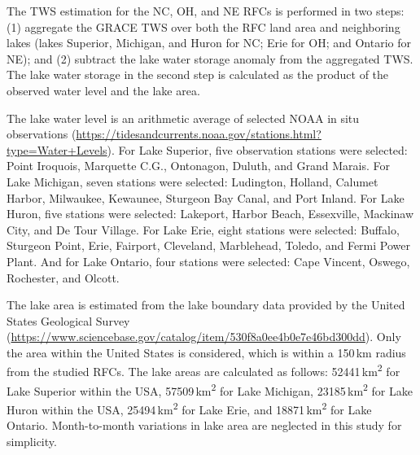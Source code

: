 \documentclass[essd, manuscript]{copernicus}
\begin{document}
The TWS estimation for the NC, OH, and NE RFCs is performed in two steps: (1) aggregate the GRACE TWS over both the RFC land area and neighboring lakes (lakes Superior, Michigan, and Huron for NC\@; Erie for OH\@; and Ontario for NE); and (2) subtract the lake water storage anomaly from the aggregated TWS\@. The lake water storage in the second step is calculated as the product of the observed water level and the lake area.

The lake water level is an arithmetic average of selected NOAA in situ observations (\url{https://tidesandcurrents.noaa.gov/stations.html?type=Water+Levels}). For Lake Superior, five observation stations were selected: Point Iroquois, Marquette C.G., Ontonagon, Duluth, and Grand Marais. For Lake Michigan, seven stations were selected: Ludington, Holland, Calumet Harbor, Milwaukee, Kewaunee, Sturgeon Bay Canal, and Port Inland. For Lake Huron, five stations were selected: Lakeport, Harbor Beach, Essexville, Mackinaw City, and De Tour Village. For Lake Erie, eight stations were selected: Buffalo, Sturgeon Point, Erie, Fairport, Cleveland, Marblehead, Toledo, and Fermi Power Plant. And for Lake Ontario, four stations were selected: Cape Vincent, Oswego, Rochester, and Olcott.

The lake area is estimated from the lake boundary data provided by the United States Geological Survey (\url{https://www.sciencebase.gov/catalog/item/530f8a0ee4b0e7e46bd300dd}). Only the area within the United States is considered, which is within a 150\,km radius from the studied RFCs. The lake areas are calculated as follows: 52441\,km\textsuperscript{2} for Lake Superior within the USA, 57509\,km\textsuperscript{2} for Lake Michigan, 23185\,km\textsuperscript{2} for Lake Huron within the USA, 25494\,km\textsuperscript{2} for Lake Erie, and 18871\,km\textsuperscript{2} for Lake Ontario. Month-to-month variations in lake area are neglected in this study for simplicity.

\noappendix

\label{sec:contribution}






\end{document}
